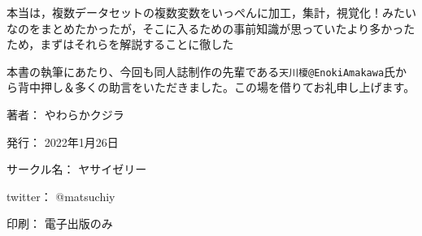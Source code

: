 \documentclass[
  xelatex,ja=standard, b5paper]{bxjsbook}
\begin{document}
本当は，複数データセットの複数変数をいっぺんに加工，集計，視覚化！みたいなのをまとめたかったが，そこに入るための事前知識が思っていたより多かったため，まずはそれらを解説することに徹した

本書の執筆にあたり、今回も同人誌制作の先輩である\texttt{天川榎@EnokiAmakawa}氏から背中押し＆多くの助言をいただきました。この場を借りてお礼申し上げます。

\clearpage
{}
\begin{flushright}
\begin{minipage}{0.5\hsize}
\begin{description}
  \item{著者：} やわらかクジラ
  \item{発行：} 2022年1月26日
  \item{サークル名：} ヤサイゼリー
  \item{twitter：} @matsuchiy
  \item{印刷：} 電子出版のみ
\end{description}
\end{minipage}
\end{flushright}
\clearpage
\end{document}
